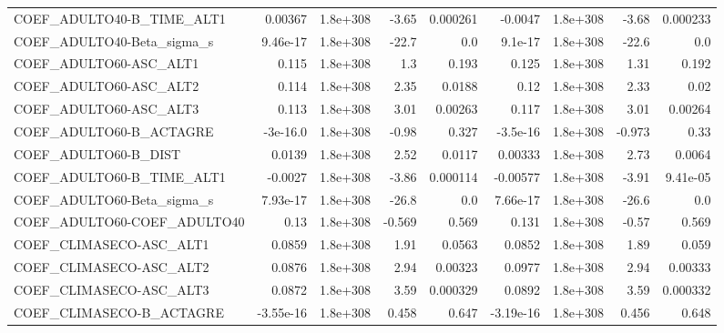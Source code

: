 \begin{tabular}{lrrrrrrrr}
COEF\_ADULTO40-B\_TIME\_ALT1         &     0.00367 &     1.8e+308 &     -3.65 & 0.000261 &    -0.0047 &    1.8e+308 &        -3.68 &      0.000233 \\
COEF\_ADULTO40-Beta\_sigma\_s        &    9.46e-17 &     1.8e+308 &     -22.7 &      0.0 &    9.1e-17 &    1.8e+308 &        -22.6 &           0.0 \\
COEF\_ADULTO60-ASC\_ALT1            &       0.115 &     1.8e+308 &       1.3 &    0.193 &      0.125 &    1.8e+308 &         1.31 &         0.192 \\
COEF\_ADULTO60-ASC\_ALT2            &       0.114 &     1.8e+308 &      2.35 &   0.0188 &       0.12 &    1.8e+308 &         2.33 &          0.02 \\
COEF\_ADULTO60-ASC\_ALT3            &       0.113 &     1.8e+308 &      3.01 &  0.00263 &      0.117 &    1.8e+308 &         3.01 &       0.00264 \\
COEF\_ADULTO60-B\_ACTAGRE           &    -3e-16.0 &     1.8e+308 &     -0.98 &    0.327 &   -3.5e-16 &    1.8e+308 &       -0.973 &          0.33 \\
COEF\_ADULTO60-B\_DIST              &      0.0139 &     1.8e+308 &      2.52 &   0.0117 &    0.00333 &    1.8e+308 &         2.73 &        0.0064 \\
COEF\_ADULTO60-B\_TIME\_ALT1         &     -0.0027 &     1.8e+308 &     -3.86 & 0.000114 &   -0.00577 &    1.8e+308 &        -3.91 &      9.41e-05 \\
COEF\_ADULTO60-Beta\_sigma\_s        &    7.93e-17 &     1.8e+308 &     -26.8 &      0.0 &   7.66e-17 &    1.8e+308 &        -26.6 &           0.0 \\
COEF\_ADULTO60-COEF\_ADULTO40       &        0.13 &     1.8e+308 &    -0.569 &    0.569 &      0.131 &    1.8e+308 &        -0.57 &         0.569 \\
COEF\_CLIMASECO-ASC\_ALT1           &      0.0859 &     1.8e+308 &      1.91 &   0.0563 &     0.0852 &    1.8e+308 &         1.89 &         0.059 \\
COEF\_CLIMASECO-ASC\_ALT2           &      0.0876 &     1.8e+308 &      2.94 &  0.00323 &     0.0977 &    1.8e+308 &         2.94 &       0.00333 \\
COEF\_CLIMASECO-ASC\_ALT3           &      0.0872 &     1.8e+308 &      3.59 & 0.000329 &     0.0892 &    1.8e+308 &         3.59 &      0.000332 \\
COEF\_CLIMASECO-B\_ACTAGRE          &   -3.55e-16 &     1.8e+308 &     0.458 &    0.647 &  -3.19e-16 &    1.8e+308 &        0.456 &         0.648 \\

\end{tabular}
